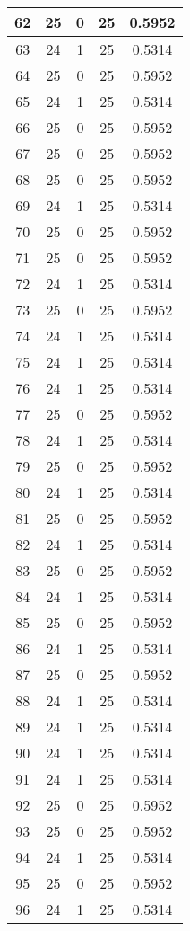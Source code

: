 \documentclass[letterpaper, 12pt]{article}
\begin{document}
\begin{longtable}{|c|c|c|c|c|}
\hline
62 & 25 & 0 & 25 & 0.5952 \\
\hline
63 & 24 & 1 & 25 & 0.5314 \\
\hline
64 & 25 & 0 & 25 & 0.5952 \\
\hline
65 & 24 & 1 & 25 & 0.5314 \\
\hline
66 & 25 & 0 & 25 & 0.5952 \\
\hline
67 & 25 & 0 & 25 & 0.5952 \\
\hline
68 & 25 & 0 & 25 & 0.5952 \\
\hline
69 & 24 & 1 & 25 & 0.5314 \\
\hline
70 & 25 & 0 & 25 & 0.5952 \\
\hline
71 & 25 & 0 & 25 & 0.5952 \\
\hline
72 & 24 & 1 & 25 & 0.5314 \\
\hline
73 & 25 & 0 & 25 & 0.5952 \\
\hline
74 & 24 & 1 & 25 & 0.5314 \\
\hline
75 & 24 & 1 & 25 & 0.5314 \\
\hline
76 & 24 & 1 & 25 & 0.5314 \\
\hline
77 & 25 & 0 & 25 & 0.5952 \\
\hline
78 & 24 & 1 & 25 & 0.5314 \\
\hline
79 & 25 & 0 & 25 & 0.5952 \\
\hline
80 & 24 & 1 & 25 & 0.5314 \\
\hline
81 & 25 & 0 & 25 & 0.5952 \\
\hline
82 & 24 & 1 & 25 & 0.5314 \\
\hline
83 & 25 & 0 & 25 & 0.5952 \\
\hline
84 & 24 & 1 & 25 & 0.5314 \\
\hline
85 & 25 & 0 & 25 & 0.5952 \\
\hline
86 & 24 & 1 & 25 & 0.5314 \\
\hline
87 & 25 & 0 & 25 & 0.5952 \\
\hline
88 & 24 & 1 & 25 & 0.5314 \\
\hline
89 & 24 & 1 & 25 & 0.5314 \\
\hline
90 & 24 & 1 & 25 & 0.5314 \\
\hline
91 & 24 & 1 & 25 & 0.5314 \\
\hline
92 & 25 & 0 & 25 & 0.5952 \\
\hline
93 & 25 & 0 & 25 & 0.5952 \\
\hline
94 & 24 & 1 & 25 & 0.5314 \\
\hline
95 & 25 & 0 & 25 & 0.5952 \\
\hline
96 & 24 & 1 & 25 & 0.5314 \\

\end{longtable}
\end{document}
